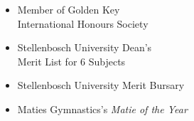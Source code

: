 \documentclass[10pt,a4paper,ragged2e,withhyper]{altacv}
\begin{document}
\begin{paracol}{2}
  \newpage

  \begin{itemize}[label=$\circ$, leftmargin=0.33cm, labelsep=0.2cm]\bfseries
    \item Member of Golden Key \\International Honours Society\\
    \item Stellenbosch University Dean's\\ Merit List for 6 Subjects\\
    \item Stellenbosch University Merit Bursary
    \item Maties Gymnastics's \textit{Matie of the Year} 
  \end{itemize}





  \\
  \\
  \\
  \medskip

  \\
  \\
  \medskip





  \medskip	


  \switchcolumn




\end{paracol}
\end{document}
